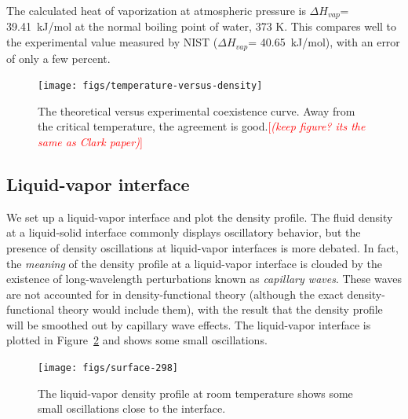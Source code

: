 \documentclass[letterpaper,twocolumn,amsmath,amssymb,prb]{revtex4-1}
\newcommand{\needsworknow}[1]{\textcolor{red}{[\emph{#1}]}}
\begin{document}

The calculated heat of vaporization at atmospheric pressure is
$\Delta H_{vap}$= 39.41~kJ/mol at the normal boiling point of water,
373 K. This compares well to the experimental
value measured by NIST ($\Delta H_{vap}$= 40.65~kJ/mol\cite{nistwater}), with 
an error of only a few percent.

\begin{figure}
\begin{center}
\texttt{[image: figs/temperature-versus-density]}
\end{center}
\caption{The theoretical versus experimental coexistence curve. Away from
the critical temperature, the agreement is good.\needsworknow{(keep figure?
its the same as Clark paper)} }
\label{fig:temperature-vs-density}
\end{figure}

\subsection{Liquid-vapor interface}

We set up a liquid-vapor
interface and plot the density profile.
The fluid density at a liquid-solid interface commonly displays
oscillatory behavior, but the presence of density oscillations at
liquid-vapor interfaces is more debated\cite{penfold2001structure}.
In fact, the \emph{meaning} of the density profile at a liquid-vapor
interface is clouded by the existence of long-wavelength perturbations
known as \emph{capillary waves}.  These waves are not accounted for in
density-functional theory (although the exact
density-functional theory would include them), with the result
that the density profile will be smoothed out by capillary wave effects. 
The liquid-vapor
interface is plotted in Figure~\ref{fig:liquid-vapor-profile} and shows
some small oscillations.

\begin{figure}
\begin{center}
\texttt{[image: figs/surface-298]}
\end{center}
\caption{The liquid-vapor density profile at room temperature shows
some small oscillations close to the interface.  }
\label{fig:liquid-vapor-profile}
\end{figure}
\end{document}
